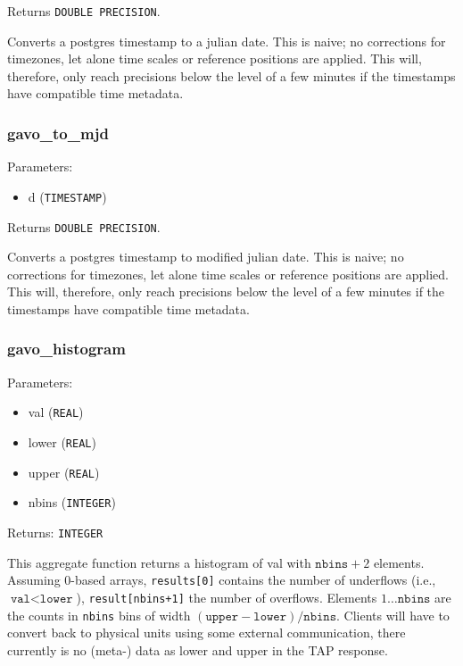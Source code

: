 \documentclass[11pt,a4paper]{ivoa}
\begin{document}
Returns \texttt{DOUBLE PRECISION}.

Converts a postgres timestamp to a julian date. This is naive;
no corrections for timezones, let alone time scales or reference
positions are applied.  This will, therefore, only reach precisions
below the level of a few minutes if the timestamps have compatible time
metadata.

\subsubsection{gavo\_to\_mjd}

Parameters:

\begin{itemize}
	\item d (\texttt{TIMESTAMP})
\end{itemize}

Returns \texttt{DOUBLE PRECISION}.

Converts a postgres timestamp to modified julian date. This is naive; 
no corrections for timezones, let alone time scales or reference
positions are applied.  This will, therefore, only reach precisions
below the level of a few minutes if the timestamps have compatible time
metadata.

\subsubsection{gavo\_histogram}

Parameters:

\begin{itemize}
	\item val (\texttt{REAL})
	\item lower (\texttt{REAL})
	\item upper (\texttt{REAL})
	\item nbins (\texttt{INTEGER})
\end{itemize}

Returns: \texttt{INTEGER\[\]}

This aggregate function returns a histogram of val with
$\texttt{nbins}+2$ elements.  Assuming 0-based arrays, \verb|results[0]|
contains the number of underflows (i.e., $\texttt{val}<\texttt{lower}$),
\verb|result[nbins+1]| the number of overflows. Elements
$1\ldots\texttt{nbins}$ are the counts in \texttt{nbins} bins of width
$(\texttt{upper}-\texttt{lower})/\texttt{nbins}$.  Clients will have to
convert back to physical units using some external communication, there
currently is no (meta-) data as lower and upper in the TAP response.
\end{document}
